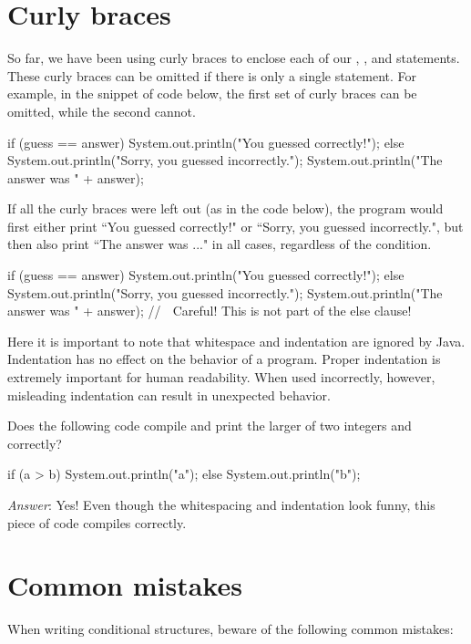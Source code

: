 \section{Curly braces}
So far, we have been using curly braces to enclose each of our , , and  statements. These curly braces can be omitted if there is only a single statement. For example, in the snippet of code below, the first set of curly braces can be omitted, while the second cannot.

\begin{code}
if (guess == answer) {
    System.out.println("You guessed correctly!");
} else {
    System.out.println("Sorry, you guessed incorrectly.");
    System.out.println("The answer was " + answer);
} 
\end{code}

\noindent If all the curly braces were left out (as in the code below), the program would first either print ``You guessed correctly!" or ``Sorry, you guessed incorrectly.", but then also print ``The answer was ..." in all cases, regardless of the condition.

\begin{code}
if (guess == answer)
    System.out.println("You guessed correctly!");
else
    System.out.println("Sorry, you guessed incorrectly.");
    System.out.println("The answer was " + answer); 
    // ^^^ Careful! This is not part of the else clause!
\end{code}

Here it is important to note that whitespace and indentation are ignored by Java. Indentation has no effect on the behavior of a program. Proper indentation is extremely important for human readability. When used incorrectly, however, misleading indentation can result in unexpected behavior.

\begin{example}
Does the following code compile and print the larger of two integers  and  correctly?

\begin{code}
if (a > b)      System.out.println("a");
else {
System.out.println("b");
}
\end{code}

\emph{Answer}: Yes! Even though the whitespacing and indentation look funny, this piece of code compiles correctly.
\end{example}

\section{Common mistakes}
When writing conditional structures, beware of the following common  mistakes:

